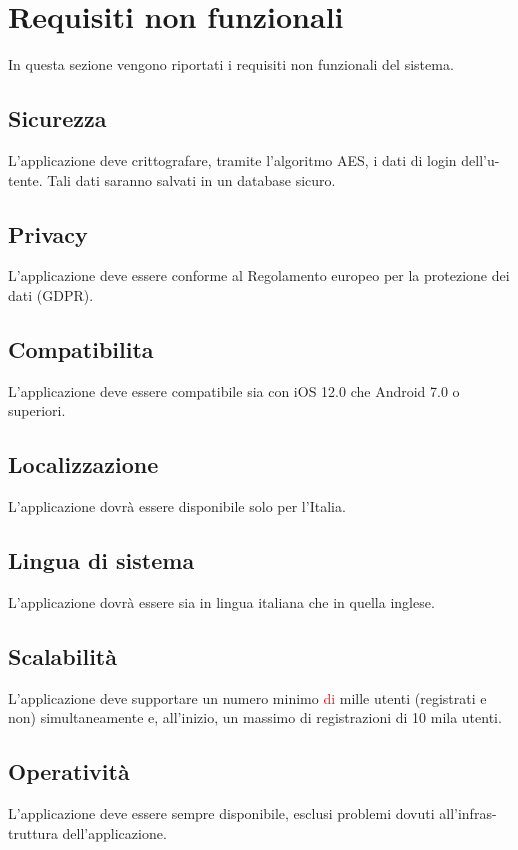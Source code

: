 \chapter{Requisiti non funzionali}
In questa sezione vengono riportati i requisiti non funzionali del sistema.

\section{Sicurezza}
L'applicazione deve crittografare, tramite l'algoritmo AES, i dati di login dell'u-tente. Tali dati saranno salvati in
un database sicuro.

\section{Privacy}
L'applicazione deve essere conforme al Regolamento europeo per la protezione dei dati (GDPR).

\section{Compatibilita} 
L'applicazione deve essere compatibile sia con iOS 12.0 che Android 7.0 o superiori.

\section{Localizzazione} 
L'applicazione dovrà essere disponibile solo per l'Italia.

\section{Lingua di sistema} 
L'applicazione dovrà essere sia in lingua italiana che in quella inglese.

\section{Scalabilità} \label{sec:scalab}
L'applicazione deve supportare un numero minimo \textcolor{red}{di} mille utenti (registrati e non) simultaneamente e, all'inizio, un 
massimo di registrazioni di 10 mila utenti.

\section{Operatività} 
L'applicazione deve essere sempre disponibile, esclusi problemi dovuti all'infras-truttura dell'applicazione.

